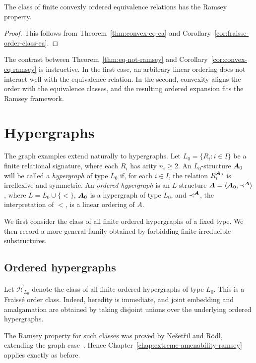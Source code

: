 \begin{corollary}
    \label{cor:convex-eq-ramsey}
    The class of finite convexly ordered equivalence relations has the Ramsey property.
\end{corollary}

\begin{proof}
    This follows from Theorem~\ref{thm:convex-eq-ea} and Corollary~\ref{cor:fraisse-order-class-ea}.
\end{proof}

The contrast between Theorem~\ref{thm:eq-not-ramsey} and Corollary~\ref{cor:convex-eq-ramsey} is instructive. In the first case, an arbitrary linear ordering does not interact well with the equivalence relation. In the second, convexity aligns the order with the equivalence classes, and the resulting ordered expansion fits the Ramsey framework.


\section{Hypergraphs}

The graph examples extend naturally to hypergraphs. Let \(L_0=\{R_i : i\in I\}\) be a finite relational signature, where each \(R_i\) has arity \(n_i\geq 2\). An \(L_0\)-structure \(\boldsymbol{A}_0\) will be called a \emph{hypergraph} of type \(L_0\) if, for each \(i\in I\), the relation \(R_i^{\boldsymbol{A}_0}\) is irreflexive and symmetric. An \emph{ordered hypergraph} is an \(L\)-structure \(\boldsymbol{A}=\langle \boldsymbol{A}_0,\prec^{\boldsymbol{A}}\rangle\), where \(L=L_0\cup\{<\}\), \(\boldsymbol{A}_0\) is a hypergraph of type \(L_0\), and \(\prec^{\boldsymbol{A}}\), the interpretation of \(<\), is a linear ordering of \(A\).

We first consider the class of all finite ordered hypergraphs of a fixed type. We then record a more general family obtained by forbidding finite irreducible substructures.

\subsection{Ordered hypergraphs}

Let \(\vec{\mathcal H}_{L_0}\) denote the class of all finite ordered hypergraphs of type \(L_0\). This is a Fraïssé order class. Indeed, heredity is immediate, and joint embedding and amalgamation are obtained by taking disjoint unions over the underlying ordered hypergraphs.

The Ramsey property for such classes was proved by Ne\v{s}et\v{r}il and R\"odl, extending the graph case~\cite{NR77,NR83}. Hence Chapter~\ref{chap:extreme-amenability-ramsey} applies exactly as before.

